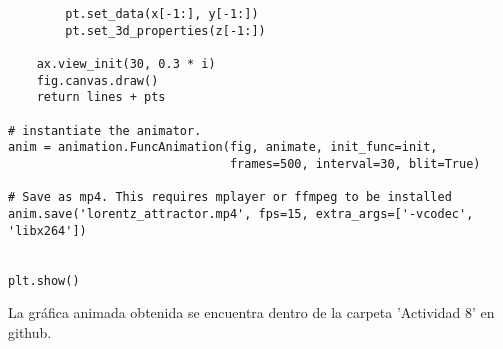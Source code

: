 \documentclass{article}
\begin{document}
\begin{verbatim}
        pt.set_data(x[-1:], y[-1:])
        pt.set_3d_properties(z[-1:])

    ax.view_init(30, 0.3 * i)
    fig.canvas.draw()
    return lines + pts

# instantiate the animator.
anim = animation.FuncAnimation(fig, animate, init_func=init,
                               frames=500, interval=30, blit=True)

# Save as mp4. This requires mplayer or ffmpeg to be installed
anim.save('lorentz_attractor.mp4', fps=15, extra_args=['-vcodec', 'libx264'])


plt.show()
\end{verbatim}

La gráfica animada obtenida se encuentra dentro de la carpeta 'Actividad 8' en github.
\end{document}
